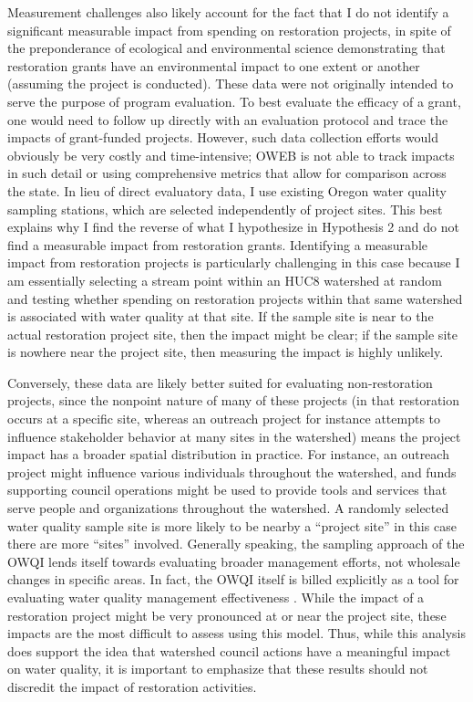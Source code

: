 \documentclass[11pt,a4paper,titlepage]{article}
\begin{document}
Measurement challenges also likely account for the fact that I do not identify a significant measurable impact from spending on restoration projects, in spite of the preponderance of ecological and environmental science demonstrating that restoration grants have an environmental impact to one extent or another (assuming the project is conducted). These data were not originally intended to serve the purpose of program evaluation. To best evaluate the efficacy of a grant, one would need to follow up directly with an evaluation protocol and trace the impacts of grant-funded projects. However, such data collection efforts would obviously be very costly and time-intensive; OWEB is not able to track impacts in such detail or using comprehensive metrics that allow for comparison across the state. In lieu of direct evaluatory data, I use existing Oregon water quality sampling stations, which are selected independently of project sites. This best explains why I find the reverse of what I hypothesize in Hypothesis 2 and do not find a measurable impact from restoration grants. Identifying a measurable impact from restoration projects is particularly challenging in this case because I am essentially selecting a stream point within an HUC8 watershed at random and testing whether spending on restoration projects within that same watershed is associated with water quality at that site. If the sample site is near to the actual restoration project site, then the impact might be clear; if the sample site is nowhere near the project site, then measuring the impact is highly unlikely. 

Conversely, these data are likely better suited for evaluating non-restoration projects, since the nonpoint nature of many of these projects (in that restoration occurs at a specific site, whereas an outreach project for instance attempts to influence stakeholder behavior at many sites in the watershed) means the project impact has a broader spatial distribution in practice. For instance, an outreach project might influence various individuals throughout the watershed, and funds supporting council operations might be used to provide tools and services that serve people and organizations throughout the watershed. A randomly selected water quality sample site is more likely to be nearby a “project site” in this case there are more ``sites'' involved. Generally speaking, the sampling approach of the OWQI lends itself towards evaluating broader management efforts, not wholesale changes in specific areas. In fact, the OWQI itself is billed explicitly as a tool for evaluating water quality management effectiveness \parencite{cude2001}. While the impact of a restoration project might be very pronounced at or near the project site, these impacts are the most difficult to assess using this model. Thus, while this analysis does support the idea that watershed council actions have a meaningful impact on water quality, it is important to emphasize that these results should not discredit the impact of restoration activities. 
\end{document}
